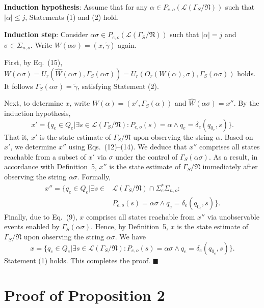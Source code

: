 \documentclass[journal,twocolumn,web]{IEEEtran}
\begin{document}
	 		\textbf{Induction hypothesis}: Assume that for any $\alpha\in P_{e,o}(\mathcal{L}(\Gamma_S/\mathfrak{N}))$ such that $|\alpha|\le j$, Statements (1) and (2) hold.  
	 		
	 		\textbf{Induction step}: Consider $\alpha\sigma\in P_{e,o}(\mathcal{L}(\Gamma_S/\mathfrak{N}))$ such that $|\alpha|=j$ and $\sigma\in\Sigma_{n,o}$. Write $W(\alpha\sigma)=(x,\tilde{\gamma})$ again.   
	 		
	 		First, by Eq.~(15), $W(\alpha\sigma)=U_r(\hat{W}(\alpha\sigma),\Gamma_S(\alpha\sigma))=U_r(O_r(W(\alpha),\sigma),\Gamma_S(\alpha\sigma))$ holds. It follows $\Gamma_S(\alpha\sigma)=\tilde{\gamma}$, satisfying Statement (2).  
	 		
	 		Next, to determine $x$, write $W(\alpha)=(x',\Gamma_S(\alpha))$ and $\hat{W}(\alpha\sigma)=x''$. By the induction hypothesis,  
	 		\[  
	 		x'=\{q_e\in Q_e|\exists s\in\mathcal{L}(\Gamma_S/\mathfrak{N}):P_{e,o}(s)=\alpha\land q_e=\delta_e(q_{0_e},s)\}.  
	 		\]  
	 		That it, $x'$ is the state estimate of $\Gamma_S/\mathfrak{N}$ upon observing the string $\alpha$. Based on $x'$, we determine $x''$ using Eqs.~(12)--(14). We deduce that $x''$ comprises all states reachable from a subset of $x'$ via $\sigma$ under the control of $\Gamma_S(\alpha\sigma)$. As a result, in accordance with Definition~5,  $x''$ is the state estimate of $\Gamma_S/\mathfrak{N}$ immediately after observing the string $\alpha\sigma$. Formally,  
	 		\begin{equation*}
	 			\begin{split}
	 				x''=\{q_e\in Q_e|\exists s\in&\mathcal{L}(\Gamma_S/\mathfrak{N})\cap\Sigma_e^*\Sigma_{n,o}:\\&P_{e,o}(s)=\alpha\sigma\wedge q_e=\delta_e(q_{0_e},s) \}.
	 			\end{split}
	 		\end{equation*}
	 		Finally, due to Eq.~(9), $x$ comprises all states reachable from $x''$ via unobservable events enabled by $\Gamma_S(\alpha\sigma)$. Hence, by Definition~5, $x$ is the state estimate of $\Gamma_S/\mathfrak{N}$ upon observing the string $\alpha\sigma$. We have 
	 		\[  
	 		x=\{q_e\in Q_e|\exists s\in\mathcal{L}(\Gamma_S/\mathfrak{N}):P_{e,o}(s)=\alpha\sigma\land q_e=\delta_e(q_{0_e},s)\}.  
	 		\]  
	 		Statement (1) holds. This completes the proof. \hfill$\blacksquare$
	 
	 		
	 		\section{Proof of Proposition 2}
	 		
\end{document}
